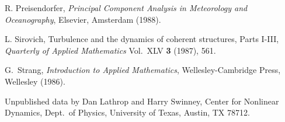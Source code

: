 \begin{thebibliography}{99}
 R. Preisendorfer, {\sl Principal Component Analysis
in Meteorology and Oceanography}, Elsevier, Amsterdam (1988).

 L. Sirovich,  Turbulence and the dynamics of
coherent structures, Parts I-III,  {\sl Quarterly of Applied 
Mathematics} Vol.~XLV {\bf 3} (1987), 561.

 G.~Strang, {\sl Introduction to Applied Mathematics},
Wellesley-Cambridge Press, Wellesley (1986).

  Unpublished data by Dan Lathrop and Harry Swinney, Center
	for Nonlinear Dynamics, Dept.\ of Physics, University of Texas,
	Austin, TX  78712.

\end{thebibliography}


